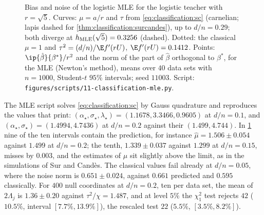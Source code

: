 \begin{refsection}
\begin{figure}[t]
\begin{fullwidth}
\vspace{1mm}
\end{fullwidth}
\caption{Bias and noise of the logistic MLE for the logistic teacher with $r=\sqrt5$. Curves: $\mu=a/r$ and $\tau$ from \eqref{eq:classification:sc} (carnelian; lapis dashed for \cref{thm:classification:surcandes}), up to $d/n=0.29$; both diverge at $h_{\mathrm{MLE}}(\sqrt5)=0.3256$ (dashed). Dotted: the classical $\mu=1$ and $\tau^2=(d/n)/\E f'(rU)$, $\E f'(rU)=0.1412$. Points: $\ip{\hat\beta}{\beta^*}/r^2$ and the norm of the part of $\hat\beta$ orthogonal to $\beta^*$, for the MLE (Newton's method), means over $40$ data sets with $n=1000$, Student-$t$ $95\%$ intervals; seed $11003$. Script: \texttt{figures/scripts/11-classification-mle.py}.}\label{fig:classification:mle}
\end{figure}

The MLE script solves \eqref{eq:classification:sc} by Gauss quadrature and reproduces the values that \textcite{SurCandes2019} print: $(\alpha_\star,\sigma_\star,\lambda_\star)=(1.1678,3.3466,0.9605)$ at $d/n=0.1$, and $(\alpha_\star,\sigma_\star)=(1.4994,4.7436)$ at $d/n=0.2$ against their $(1.499,4.744)$. In \cref{fig:classification:mle} nine of the ten intervals contain the prediction, for instance $\hat\mu=1.506\pm0.054$ against $1.499$ at $d/n=0.2$; the tenth, $1.339\pm0.037$ against $1.299$ at $d/n=0.15$, misses by $0.003$, and the estimates of $\mu$ sit slightly above the limit, as in the simulations of Sur and Candès. The classical values fail already at $d/n=0.05$, where the noise norm is $0.651\pm0.024$, against $0.661$ predicted and $0.595$ classically. For $400$ null coordinates at $d/n=0.2$, ten per data set, the mean of $2\Lambda_j$ is $1.36\pm0.20$ against $\tau^2/\chi=1.487$, and at level $5\%$ the $\chi^2_1$ test rejects $42$ ($10.5\%$, interval $[7.7\%,13.9\%]$), the rescaled test $22$ ($5.5\%$, $[3.5\%,8.2\%]$).


\end{refsection}
